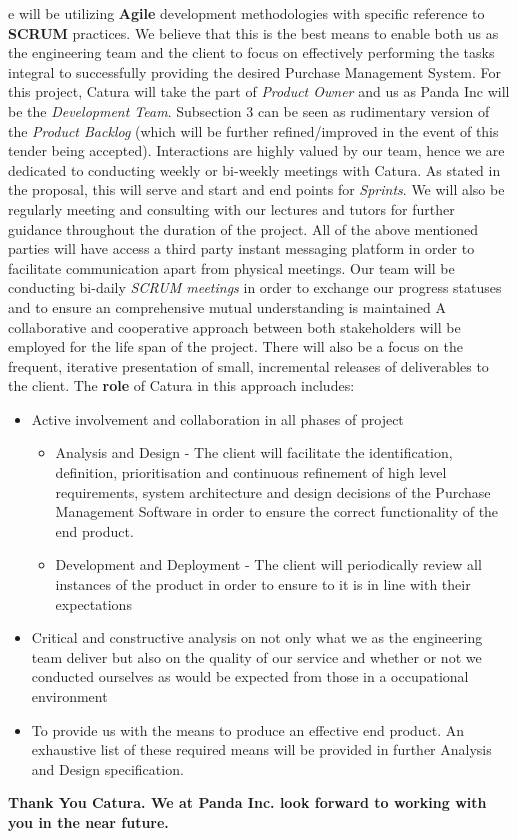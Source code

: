 \documentclass[11pt]{article}
\begin{document}
e will be utilizing \textbf{Agile} development methodologies with specific reference to \textbf{SCRUM} practices. We believe that this is the best means to enable both us as the engineering team and the client to focus on effectively performing the tasks integral to successfully providing the desired Purchase Management System. 
For this project, Catura will take the part of \emph{Product Owner} and us as Panda Inc will be the \emph{Development Team}. Subsection 3 can be seen as rudimentary version of the \emph{Product Backlog} (which will be further refined/improved in the event of this tender being accepted).
\newline \newline
Interactions are highly valued by our team, hence we are dedicated to conducting weekly or bi-weekly meetings with Catura. As stated in the proposal, this will serve and start and end points for \emph{Sprints}. We will also be regularly meeting and consulting with our lectures and tutors for further guidance throughout the duration of the project. All of the above mentioned parties will have access a third party instant messaging platform in order to facilitate communication apart from physical meetings. Our team will be conducting bi-daily \emph{SCRUM meetings} in order to exchange our progress statuses and to ensure an comprehensive mutual understanding is maintained
\newline \newline
A collaborative and cooperative approach between both stakeholders will be employed for the life span of the project. There will also be a focus on the frequent, iterative presentation of small, incremental releases of deliverables to the client. The \textbf{role} of Catura in this approach includes:
\begin{itemize}
\item Active involvement and collaboration in all phases of project
  \begin{itemize}
  \item Analysis and Design - The client will facilitate the identification, definition, prioritisation and continuous refinement of high level requirements, system architecture and design decisions of the Purchase Management Software in order to ensure the correct functionality of the end product.
  \item Development and Deployment - The client will periodically review all instances of the product in order to ensure to it is in line with their expectations 
  \end{itemize}
\item Critical and constructive analysis on not only what we as the engineering team deliver but also on the quality of our service and whether or not we conducted ourselves as would be expected from those in a occupational environment
\item To provide us with the means to produce an effective end product. An exhaustive list of these required means will be provided in further Analysis and Design specification.
  
\end{itemize}
\begin{center}
{\sffamily\bfseries
\large Thank You Catura. We at Panda Inc. look forward to working with you in the near future.
}
\end{center}
\end{document}
